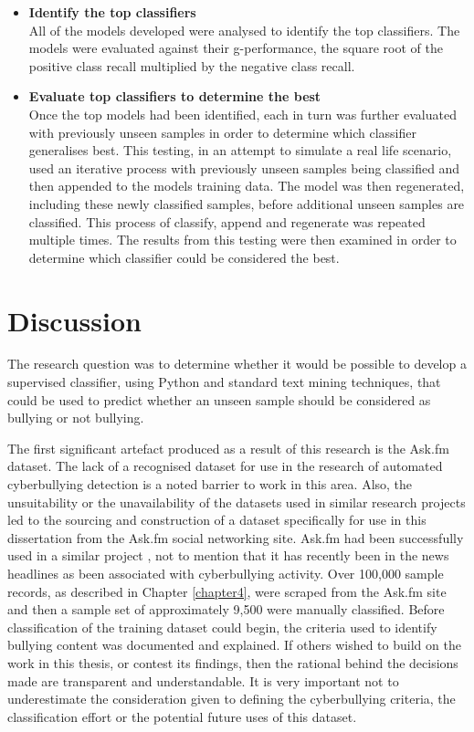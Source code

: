 \begin{itemize}
	\item \textbf{Identify the top classifiers} \\
	All of the models developed were analysed to identify the top classifiers. The models were evaluated against their g-performance, the square root of the positive class recall multiplied by the negative class recall.
	
	\item \textbf{Evaluate top classifiers to determine the best} \\
	Once the top models had been identified, each in turn was further evaluated with previously unseen samples in order to determine which classifier generalises best. This testing, in an attempt to simulate a real life scenario, used an iterative process with previously unseen samples being classified and then appended to the models training data. The model was then regenerated, including these newly classified samples, before additional unseen samples are classified. This process of classify, append and regenerate was repeated multiple times. The results from this testing were then examined in order to determine which classifier could be considered the best.

\end{itemize}

\section{Discussion}

The research question was to determine whether it would be possible to develop a supervised classifier, using Python and standard text mining techniques, that could be used to predict whether an unseen sample should be considered as bullying or not bullying.

The first significant artefact produced as a result of this research is the Ask.fm dataset. The lack of a recognised dataset for use in the research of automated cyberbullying detection is a noted barrier to work in this area. Also, the unsuitability or the unavailability of the datasets used in similar research projects led to the sourcing and construction of a dataset specifically for use in this dissertation from the Ask.fm social networking site. Ask.fm had been successfully used in a similar project \cite{colton:2014}, not to mention that it has recently been in the news headlines as been associated with cyberbullying activity. Over 100,000 sample records, as described in Chapter \ref{chapter4}, were scraped from the Ask.fm site and then a sample set of approximately 9,500 were manually classified. Before classification of the training dataset could begin, the criteria used to identify bullying content was documented and explained. If others wished to build on the work in this thesis, or contest its findings, then the rational behind the decisions made are transparent and understandable. It is very important not to underestimate the consideration given to defining the cyberbullying criteria, the classification effort or the potential future uses of this dataset.

